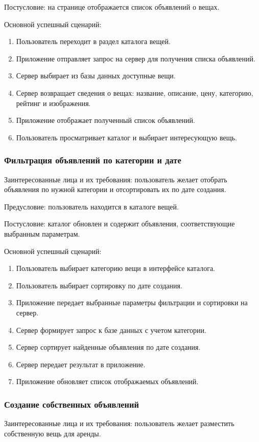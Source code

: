 Постусловие: на странице отображается список объявлений о вещах.

Основной успешный сценарий:
\begin{enumerate}
    \item Пользователь переходит в раздел каталога вещей.
    \item Приложение отправляет запрос на сервер для получения списка объявлений.
    \item Сервер выбирает из базы данных доступные вещи.
    \item Сервер возвращает сведения о вещах: название, описание, цену, категорию, рейтинг и изображения.
    \item Приложение отображает полученный список объявлений.
    \item Пользователь просматривает каталог и выбирает интересующую вещь.
\end{enumerate}
\subsubsection{Фильтрация объявлений по категории и дате}
Заинтересованные лица и их требования: пользователь желает отобрать объявления по нужной категории и отсортировать их по дате создания.

Предусловие: пользователь находится в каталоге вещей.

Постусловие: каталог обновлен и содержит объявления, соответствующие выбранным параметрам.

Основной успешный сценарий:
\begin{enumerate}
    \item Пользователь выбирает категорию вещи в интерфейсе каталога.
    \item Пользователь выбирает сортировку по дате создания.
    \item Приложение передает выбранные параметры фильтрации и сортировки на сервер.
    \item Сервер формирует запрос к базе данных с учетом категории.
    \item Сервер сортирует найденные объявления по дате создания.
    \item Сервер передает результат в приложение.
    \item Приложение обновляет список отображаемых объявлений.
\end{enumerate}
\subsubsection{Создание собственных объявлений}
Заинтересованные лица и их требования: пользователь желает разместить собственную вещь для аренды.

